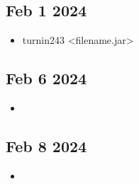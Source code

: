 \documentclass[12pt]{article}
\begin{document}
\subsection*{Feb 1 2024}

\begin{itemize}
		  \item turnin243 <filename.jar>
\end{itemize}

\subsection*{Feb 6 2024}

\begin{itemize}
		  \item  
\end{itemize}


\subsection*{Feb 8 2024}

\begin{itemize}
		  \item 
\end{itemize}
\end{document}
